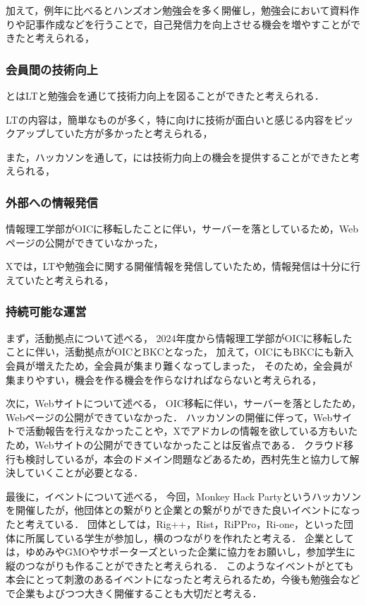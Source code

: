 加えて，例年に比べるとハンズオン勉強会を多く開催し，勉強会において資料作りや記事作成などを行うことで，自己発信力を向上させる機会を増やすことができたと考えられる，

\subsubsection*{会員間の技術向上}
\secondGrade{}と\thirdGrade{}はLTと勉強会を通じて技術力向上を図ることができたと考えられる．

LTの内容は，簡単なものが多く，特に\firstGrade{}向けに技術が面白いと感じる内容をピックアップしていた方が多かったと考えられる，

また，ハッカソンを通して，\firstGrade{}には技術力向上の機会を提供することができたと考えられる，

\subsubsection*{外部への情報発信}
情報理工学部がOICに移転したことに伴い，サーバーを落としているため，Webページの公開ができていなかった，

Xでは，LTや勉強会に関する開催情報を発信していたため，情報発信は十分に行えていたと考えられる，

\subsubsection*{持続可能な運営}

まず，活動拠点について述べる，
2024年度から情報理工学部がOICに移転したことに伴い，活動拠点がOICとBKCとなった，
加えて，OICにもBKCにも新入会員が増えたため，全会員が集まり難くなってしまった，
そのため，全会員が集まりやすい，機会を作る機会を作らなければならないと考えられる，

次に，Webサイトについて述べる，
OIC移転に伴い，サーバーを落としたため，Webページの公開ができていなかった．
ハッカソンの開催に伴って，Webサイトで活動報告を行えなかったことや，Xでアドカレの情報を欲している方もいたため，Webサイトの公開ができていなかったことは反省点である．
クラウド移行も検討しているが，本会のドメイン問題などあるため，西村先生と協力して解決していくことが必要となる．

最後に，イベントについて述べる，
今回，Monkey Hack Partyというハッカソンを開催したが，他団体との繋がりと企業との繋がりができた良いイベントになったと考えている．
団体としては，Rig++，Rist，RiPPro，Ri-one，といった団体に所属している学生が参加し，横のつながりを作れたと考える．
企業としては，ゆめみやGMOやサポーターズといった企業に協力をお願いし，参加学生に縦のつながりも作ることができたと考えられる．
このようなイベントがとても本会にとって刺激のあるイベントになったと考えられるため，今後も勉強会などで企業もよびつつ大きく開催することも大切だと考える．


